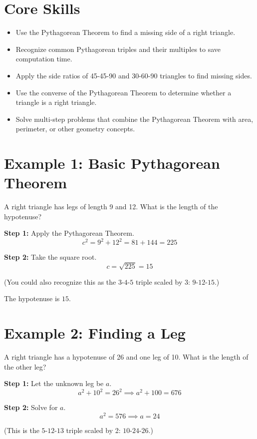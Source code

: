 \documentclass[14pt]{extarticle}
\begin{document}
\section*{Core Skills}
\begin{itemize}
  \item Use the Pythagorean Theorem to find a missing side of a right triangle.
  \item Recognize common Pythagorean triples and their multiples to save computation time.
  \item Apply the side ratios of 45-45-90 and 30-60-90 triangles to find missing sides.
  \item Use the converse of the Pythagorean Theorem to determine whether a triangle is a right triangle.
  \item Solve multi-step problems that combine the Pythagorean Theorem with area, perimeter, or other geometry concepts.
\end{itemize}

\section*{Example 1: Basic Pythagorean Theorem}

A right triangle has legs of length 9 and 12. What is the length of the hypotenuse?

\textbf{Step 1:} Apply the Pythagorean Theorem.
\[
c^2 = 9^2 + 12^2 = 81 + 144 = 225
\]

\textbf{Step 2:} Take the square root.
\[
c = \sqrt{225} = 15
\]

(You could also recognize this as the \(3\text{-}4\text{-}5\) triple scaled by 3: \(9\text{-}12\text{-}15\).)

The hypotenuse is \(\boxed{15}\).

\section*{Example 2: Finding a Leg}

A right triangle has a hypotenuse of 26 and one leg of 10. What is the length of the other leg?

\textbf{Step 1:} Let the unknown leg be \(a\).
\[
a^2 + 10^2 = 26^2 \implies a^2 + 100 = 676
\]

\textbf{Step 2:} Solve for \(a\).
\[
a^2 = 576 \implies a = 24
\]

(This is the \(5\text{-}12\text{-}13\) triple scaled by 2: \(10\text{-}24\text{-}26\).)
\end{document}
